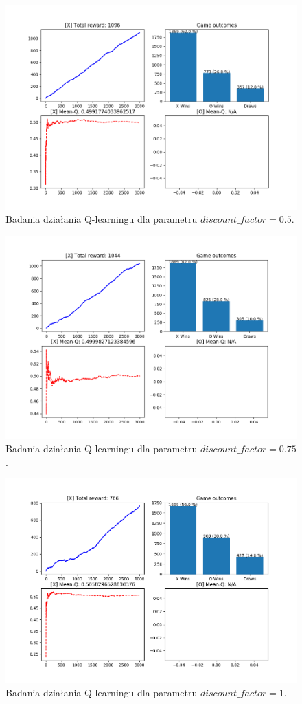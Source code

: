 \begin{figure}[H]
	\centering
	\includegraphics[width=0.7\linewidth]{imgs/q_learning/analysis/no_batch/df/df_05}
	\caption{Badania działania Q-learningu dla parametru $discount\_factor = 0.5$.}
\end{figure}

\begin{figure}[H]
	\centering
	\includegraphics[width=0.7\linewidth]{imgs/q_learning/analysis/no_batch/df/df_075}
	\caption{Badania działania Q-learningu dla parametru $discount\_factor = 0.75$.}
\end{figure}

\begin{figure}[H]
	\centering
	\includegraphics[width=0.7\linewidth]{imgs/q_learning/analysis/no_batch/df/df_1}
	\caption{Badania działania Q-learningu dla parametru $discount\_factor = 1$.}
\end{figure}


